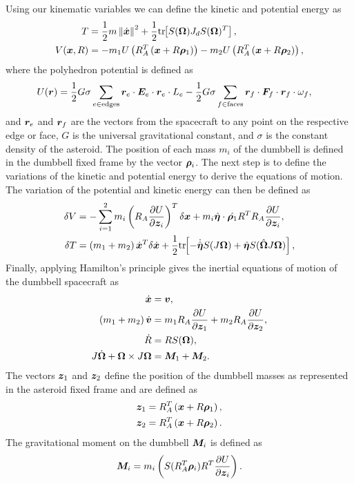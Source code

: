 \documentclass[letterpaper, paper,11pt]{AAS}		%
\begin{document}
Using our kinematic variables we can define the kinetic and potential energy as
\begin{align}\label{eq:kinetic_energy}
    T &= \frac{1}{2} m \left\| \dot{\bm{x}} \right\|^2 + \frac{1}{2} \mathrm{tr}\negthickspace\left[ S(\bm{\Omega}) J_d S(\bm{\Omega})^T \right] , \\
    V( \bm{x}, R ) &=  - m_1 U \left( R_A^T \left( \bm{x} + R \bm{\rho}_1 \right) \right) - m_2 U \left( R_A^T \left( \bm{x} + R \bm{\rho}_2 \right) \right) ,
\end{align}
where the polyhedron potential is defined as 
\begin{align}
    U(\bm{r}) &= \frac{1}{2} G \sigma \sum_{e \in \text{edges}} \bm{r}_e \cdot \bm{E}_e \cdot \bm{r}_e \cdot L_e - \frac{1}{2}G \sigma \sum_{f \in \text{faces}} \bm{r}_f \cdot \bm{F}_f \cdot \bm{r}_f \cdot \omega_f,
\end{align}
and \( \bm{r}_e\) and \(\bm{r}_f \) are the vectors from the spacecraft to any point on the respective edge or face, \( G\) is the universal gravitational constant, and \( \sigma \) is the constant density of the asteroid.
The position of each mass \(m_i\) of the dumbbell is defined in the dumbbell fixed frame by the vector \(\bm{\rho}_i\). 
The next step is to define the variations of the kinetic and potential energy to derive the equations of motion.
The variation of the potential and kinetic energy can then be defined as
\begin{align} 
    \delta V &= -\sum_{i=1}^2  m_i \left( R_A \frac{\partial U}{\partial \bm{z}_i}  \right)^T \delta \bm{x} + m_i \hat{\bm{\eta}}\cdot \hat{\bm{\rho}_1} R^T R_A \frac{\partial U}{\partial \bm{z}_i}, \\
    \delta T &= \left( m_1 + m_2 \right) \dot{\bm{x}}^T \delta \dot{\bm{x}} + \frac{1}{2} \mathrm{tr}\negthickspace\left[  - \dot{\hat{\bm{\eta}}} S(J \bm{\Omega}) + \hat{\bm{\eta}} S(\hat{ \bm{\Omega}} J \bm{\Omega}) \right] , 
\end{align}
Finally, applying Hamilton's principle gives the inertial equations of motion of the dumbbell spacecraft as
\begin{align}
    \dot{\bm{x}} &= \bm{v}, \\
    \left( m_1 + m_2 \right) \dot{\bm{v}} &= m_1 R_A \frac{\partial U}{\partial \bm{z}_1} + m_2 R_A \frac{\partial U}{\partial \bm{z}_2}, \\
    \dot{R} &= R S(\bm{\Omega}) , \\
    J \dot{\bm{\Omega}} + \bm{\Omega} \times J \bm{\Omega} &= \bm{M}_1 + \bm{M}_2.
\end{align}
The vectors \( \bm{z}_1 \) and \( \bm{z}_2\) define the position of the dumbbell masses as represented in the asteroid fixed frame and are defined as
\begin{align}
    \bm{z}_1 &= R_A^T \left( \bm{x} + R \bm{\rho}_1 \right) , \\
    \bm{z}_2 &= R_A^T \left( \bm{x} + R \bm{\rho}_2 \right).
\end{align}
The gravitational moment on the dumbbell \( \bm{M}_i\) is defined as
\begin{align}
    \bm{M}_i = m_i \left( S(R_A^T \bm{\rho}_i) R^T \frac{\partial U}{\partial \bm{z}_i} \right).
\end{align}
 
\end{document}
